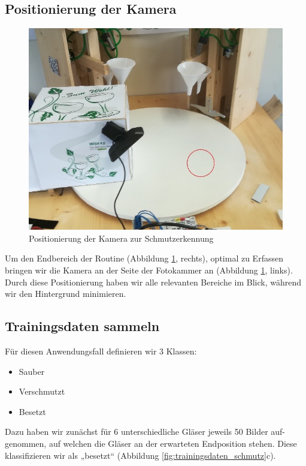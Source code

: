 \subsection{Positionierung der Kamera}
\begin{figure}
	\centering
	\includegraphics[width=\linewidth]{content/pictures/position_der_Kamera_zu_Schmutz}
	\caption{Positionierung der Kamera zur Schmutzerkennung}
	\label{fig:position_der_kamera_zu_schmutz}
\end{figure}
Um den Endbereich der Routine (Abbildung \ref{fig:position_der_kamera_zu_schmutz}, rechts), optimal zu Erfassen bringen wir die Kamera an der Seite der Fotokammer an (Abbildung \ref{fig:position_der_kamera_zu_schmutz}, links). Durch diese Positionierung haben wir alle relevanten Bereiche im Blick, während wir den Hintergrund minimieren.

\subsection{Trainingsdaten sammeln}
Für diesen Anwendungsfall definieren wir 3 Klassen:
\begin{itemize}
	\item Sauber
	\item Verschmutzt
	\item Besetzt
\end{itemize}
Dazu haben wir zunächst für 6 unterschiedliche Gläser jeweils 50 Bilder auf-genommen, auf welchen die Gläser an der erwarteten Endposition stehen. Diese klassifizieren wir als „besetzt“ (Abbildung \ref{fig:trainingsdaten_schmutz}c).

